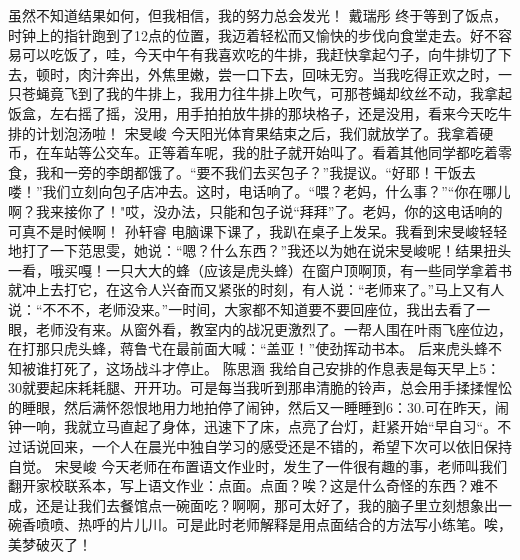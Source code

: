 {}虽然不知道结果如何，但我相信，我的努力总会发光！\markdownRendererInterblockSeparator
{}\markdownRendererInterblockSeparator
{}戴瑞彤\markdownRendererInterblockSeparator
{}终于等到了饭点，时钟上的指针跑到了12点的位置，我迈着轻松而又愉快的步伐向食堂走去。好不容易可以吃饭了，哇，今天中午有我喜欢吃的牛排，我赶快拿起勺子，向牛排切了下去，顿时，肉汁奔出，外焦里嫩，尝一口下去，回味无穷。当我吃得正欢之时，一只苍蝇竟飞到了我的牛排上，我用力往牛排上吹气，可那苍蝇却纹丝不动，我拿起饭盒，左右摇了摇，没用，用手拍拍放牛排的那块格子，还是没用，看来今天吃牛排的计划泡汤啦！\markdownRendererInterblockSeparator
{}\markdownRendererInterblockSeparator
{}宋旻峻\markdownRendererInterblockSeparator
{}今天阳光体育果结束之后，我们就放学了。我拿着硬币，在车站等公交车。正等着车呢，我的肚子就开始叫了。看着其他同学都吃着零食，我和一旁的李朗都饿了。“要不我们去买包子？”我提议。“好耶！干饭去喽！”我们立刻向包子店冲去。这时，电话响了。“喂？老妈，什么事？”“你在哪儿啊？我来接你了！"哎，没办法，只能和包子说“拜拜”了。老妈，你的这电话响的可真不是时候啊！\markdownRendererInterblockSeparator
{}\markdownRendererInterblockSeparator
{}孙轩睿\markdownRendererInterblockSeparator
{}电脑课下课了，我趴在桌子上发呆。我看到宋旻峻轻轻地打了一下范思雯，她说：“嗯？什么东西？”我还以为她在说宋旻峻呢！结果扭头一看，哦买嘎！一只大大的蜂（应该是虎头蜂）在窗户顶啊顶，有一些同学拿着书就冲上去打它，在这令人兴奋而又紧张的时刻，有人说：“老师来了。”马上又有人说：“不不不，老师没来。”一时间，大家都不知道要不要回座位，我出去看了一眼，老师没有来。从窗外看，教室内的战况更激烈了。一帮人围在叶雨飞座位边，在打那只虎头蜂，蒋鲁弋在最前面大喊：“盖亚！”使劲挥动书本。 后来虎头蜂不知被谁打死了，这场战斗才停止。\markdownRendererInterblockSeparator
{}\markdownRendererInterblockSeparator
{}陈思涵\markdownRendererInterblockSeparator
{}我给自己安排的作息表是每天早上5：30就要起床耗耗腿、开开功。可是每当我听到那串清脆的铃声，总会用手揉揉惺忪的睡眼，然后满怀怨恨地用力地拍停了闹钟，然后又一睡睡到6：30.可在昨天，闹钟一响，我就立马直起了身体，迅速下了床，点亮了台灯，赶紧开始“早自习“。不过话说回来，一个人在晨光中独自学习的感受还是不错的，希望下次可以依旧保持自觉。\markdownRendererInterblockSeparator
{}\markdownRendererInterblockSeparator
{}宋旻峻\markdownRendererInterblockSeparator
{}今天老师在布置语文作业时，发生了一件很有趣的事，老师叫我们翻开家校联系本，写上语文作业：点面。点面？唉？这是什么奇怪的东西？难不成，还是让我们去餐馆点一碗面吃？啊啊，那可太好了，我的脑子里立刻想象出一碗香喷喷、热呼的片儿川。可是此时老师解释是用点面结合的方法写小练笔。唉，美梦破灭了！\markdownRendererInterblockSeparator
